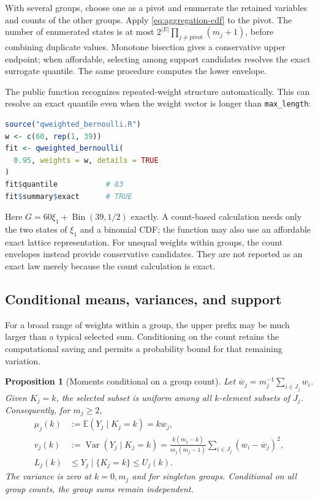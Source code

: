 \documentclass[11pt,letterpaper]{article}
\numberwithin{equation}{section}
\newtheorem{proposition}[theorem]{Proposition}
\theoremstyle{definition}
\theoremstyle{remark}
\newcommand{\E}{\mathbb E}
\DeclareMathOperator{\Var}{Var}
\begin{document}
With several groups, choose one as a pivot and enumerate the retained
variables and counts of the other groups. Apply
\eqref{eq:aggregation-cdf} to the pivot. The number of enumerated states
is at most $2^{|E|}\prod_{j\ne\mathrm{pivot}}(m_j+1)$, before combining
duplicate values. Monotone bisection gives a conservative upper endpoint;
when affordable, selecting among support candidates resolves the exact
surrogate quantile. The same procedure computes the lower envelope.

The public function recognizes repeated-weight structure automatically.
This can resolve an exact quantile even when the weight vector is longer
than \texttt{max\_length}:

\begin{minipage}{\linewidth}
\begin{lstlisting}[language=R]
source("qweighted_bernoulli.R")
w <- c(60, rep(1, 39))
fit <- qweighted_bernoulli(
  0.95, weights = w, details = TRUE
)
fit$quantile           # 83
fit$summary$exact      # TRUE
\end{lstlisting}
\end{minipage}

Here $G=60\xi_1+\operatorname{Bin}(39,1/2)$ exactly. A count-based
calculation needs only the two states of $\xi_1$ and a binomial CDF;
the function may also use an affordable exact lattice representation.
For unequal weights within groups, the count envelopes instead provide
conservative candidates. They are not reported as an exact law merely
because the count calculation is exact.

\subsection{Conditional means, variances, and support}

For a broad range of weights within a group, the upper prefix may be much
larger than a typical selected sum. Conditioning on the count retains the
computational saving and permits a probability bound for that remaining
variation.


\begin{minipage}{\linewidth}
\begin{proposition}[Moments conditional on a group count]
\label{prop:aggregation-moments}
Let $\overline w_j=m_j^{-1}\sum_{i\in J_j}w_i$. Given $K_j=k$, the
selected subset is uniform among all $k$-element subsets of $J_j$.
Consequently, for $m_j\ge2$,
\begin{equation}
 \begin{split}
 \mu_j(k)&:=\E(Y_j\mid K_j=k)=k\overline w_j,\\
 v_j(k)&:=\Var(Y_j\mid K_j=k)
   =\frac{k(m_j-k)}{m_j(m_j-1)}
      \sum_{i\in J_j}(w_i-\overline w_j)^2,\\
 L_j(k)&\le Y_j\mid\{K_j=k\}\le U_j(k).
 \end{split}
 \label{eq:aggregation-moments}
\end{equation}
The variance is zero at $k=0,m_j$ and for singleton groups.
Conditional on all group counts, the group sums remain independent.
\end{proposition}
\end{minipage}
\end{document}
